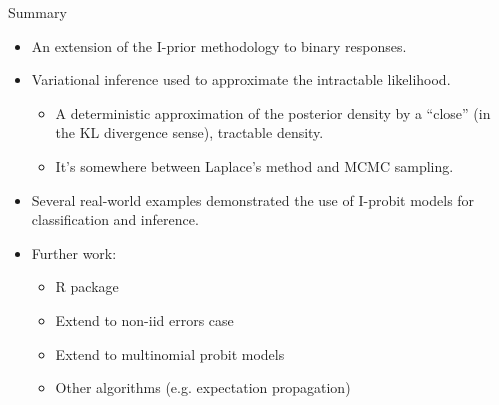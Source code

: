 \begin{frame}[label=summary]{Summary}
  \vspace{-10pt}
  \begin{itemize}\setlength\itemsep{0.8em}
    \item An extension of the I-prior methodology to binary responses.
    \item Variational inference used to approximate the intractable likelihood.
    \begin{itemize}
      \item A deterministic approximation of the posterior density by a ``close'' (in the KL divergence sense), tractable density.
      \item It's somewhere between Laplace's method and MCMC sampling. \hyperlink{varcompare}{}
    \end{itemize}
    \item Several real-world examples demonstrated the use of I-probit models for classification and inference.
    \item Further work:
    \begin{itemize}
      \item R package 
      \item Extend to non-iid errors case
      \item Extend to multinomial probit models
      \item Other algorithms (e.g. expectation propagation)
    \end{itemize}
  \end{itemize}
\end{frame}
